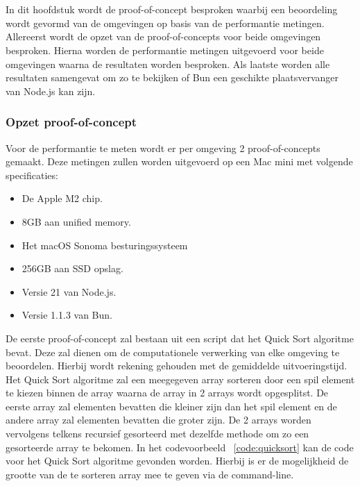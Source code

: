 
\chapter{}%
\label{ch:proof-of-concept}

In dit hoofdstuk wordt de proof-of-concept besproken 
waarbij een beoordeling wordt gevormd van de omgevingen op basis van de performantie metingen.
Allereerst wordt de opzet van de proof-of-concepts voor beide omgevingen besproken.
Hierna worden de performantie metingen uitgevoerd voor beide omgevingen waarna de resultaten worden besproken.
Als laatste worden alle resultaten samengevat om zo te bekijken of Bun een geschikte plaatsvervanger van Node.js kan zijn.

\subsection{Opzet proof-of-concept}
Voor de performantie te meten wordt er per omgeving 2 proof-of-concepts gemaakt. 
Deze metingen zullen worden uitgevoerd op een Mac mini met volgende specificaties:
\begin{itemize}
  \item De Apple M2 chip.
  \item 8GB aan unified memory.
  \item Het macOS Sonoma besturingssysteem
  \item 256GB aan SSD opslag.
  \item Versie 21 van Node.js.
  \item Versie 1.1.3 van Bun.
\end{itemize}
De eerste proof-of-concept zal bestaan uit een script dat het Quick Sort algoritme bevat. 
Deze zal dienen om de computationele verwerking van elke omgeving te beoordelen. Hierbij wordt rekening gehouden met de gemiddelde uitvoeringstijd.
Het Quick Sort algoritme zal een meegegeven array sorteren door een spil element te kiezen binnen de array
waarna de array in 2 arrays wordt opgesplitst. De eerste array zal elementen bevatten die kleiner zijn dan het spil element 
en de andere array zal elementen bevatten die groter zijn. 
De 2 arrays worden vervolgens telkens recursief gesorteerd met dezelfde methode om zo een gesorteerde array te bekomen.
In het codevoorbeeld ~\ref{code:quicksort} kan de code voor het Quick Sort algoritme gevonden worden.
Hierbij is er de mogelijkheid de grootte van de te sorteren array mee te geven via de command-line.

